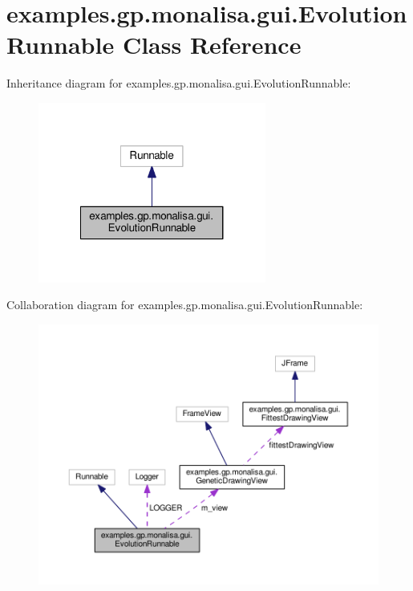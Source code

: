 \hypertarget{classexamples_1_1gp_1_1monalisa_1_1gui_1_1_evolution_runnable}{\section{examples.\-gp.\-monalisa.\-gui.\-Evolution\-Runnable Class Reference}
\label{classexamples_1_1gp_1_1monalisa_1_1gui_1_1_evolution_runnable}
}


Inheritance diagram for examples.\-gp.\-monalisa.\-gui.\-Evolution\-Runnable\-:
\nopagebreak
\begin{figure}[H]
\begin{center}
\leavevmode
\includegraphics[width=212pt]{classexamples_1_1gp_1_1monalisa_1_1gui_1_1_evolution_runnable__inherit__graph}
\end{center}
\end{figure}


Collaboration diagram for examples.\-gp.\-monalisa.\-gui.\-Evolution\-Runnable\-:
\nopagebreak
\begin{figure}[H]
\begin{center}
\leavevmode
\includegraphics[width=350pt]{classexamples_1_1gp_1_1monalisa_1_1gui_1_1_evolution_runnable__coll__graph}
\end{center}
\end{figure}
